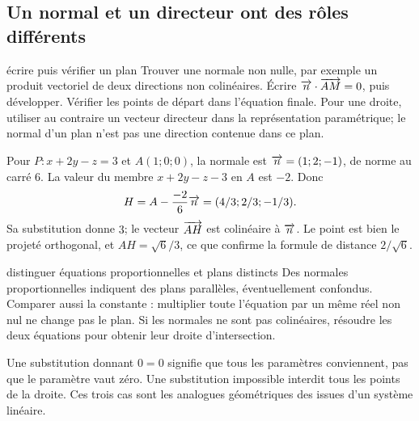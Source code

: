 \subsection*{Un normal et un directeur ont des rôles différents}
\begin{methode}{écrire puis vérifier un plan}
Trouver une normale non nulle, par exemple un produit vectoriel de deux directions non colinéaires. Écrire $\overrightarrow{n}\cdot\overrightarrow{AM}=0$, puis développer. Vérifier les points de départ dans l’équation finale. Pour une droite, utiliser au contraire un vecteur directeur dans la représentation paramétrique; le normal d’un plan n’est pas une direction contenue dans ce plan.
\end{methode}
\begin{exemple}
Pour $P:x+2y-z=3$ et $A(1;0;0)$, la normale est $\overrightarrow{n}=(1;2;-1)$, de norme au carré $6$. La valeur du membre $x+2y-z-3$ en $A$ est $-2$. Donc
\[
H=A-\frac{-2}{6}\overrightarrow{n}=(4/3;2/3;-1/3).
\]
Sa substitution donne $3$; le vecteur $\overrightarrow{AH}$ est colinéaire à $\overrightarrow{n}$. Le point est bien le projeté orthogonal, et $AH=\sqrt6/3$, ce que confirme la formule de distance $2/\sqrt6$.
\end{exemple}
\begin{methode}{distinguer équations proportionnelles et plans distincts}
Des normales proportionnelles indiquent des plans parallèles, éventuellement confondus. Comparer aussi la constante : multiplier toute l’équation par un même réel non nul ne change pas le plan. Si les normales ne sont pas colinéaires, résoudre les deux équations pour obtenir leur droite d’intersection.
\end{methode}
\begin{remarque}Une substitution donnant $0=0$ signifie que tous les paramètres conviennent, pas que le paramètre vaut zéro. Une substitution impossible interdit tous les points de la droite. Ces trois cas sont les analogues géométriques des issues d’un système linéaire.\end{remarque}

